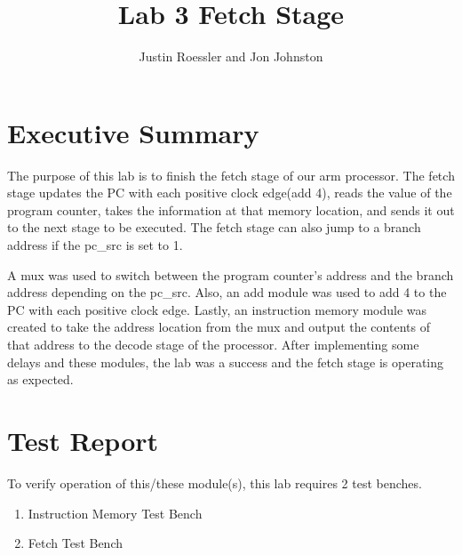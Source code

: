 \documentclass{article}
\author{Justin Roessler and Jon Johnston}
\title{Lab 3 Fetch Stage}
\begin{document}
\maketitle

\section{Executive Summary}
The purpose of this lab is to finish the fetch stage of our arm processor. The fetch stage updates the PC with each positive clock edge(add 4), reads the value of the program counter, takes the information at that memory location, and sends it out to the next stage to be executed. The fetch stage can also jump to a branch address if the pc\_src is set to 1. 

A mux was used to switch between the program counter's address and the branch address depending on the pc\_src. Also, an add module was used to add 4 to the PC with each positive clock edge. Lastly, an instruction memory module was created to take the address location from the mux and output the contents of that address to the decode stage of the processor. After implementing some delays and these modules, the lab was a success and the fetch stage is operating as expected.


\section{Test Report}
To verify operation of this/these module(s), this lab requires 2 test benches. 
\begin{enumerate}
	\item Instruction Memory Test Bench
	\item Fetch Test Bench
\end{enumerate}


\pagebreak
\end{document}
